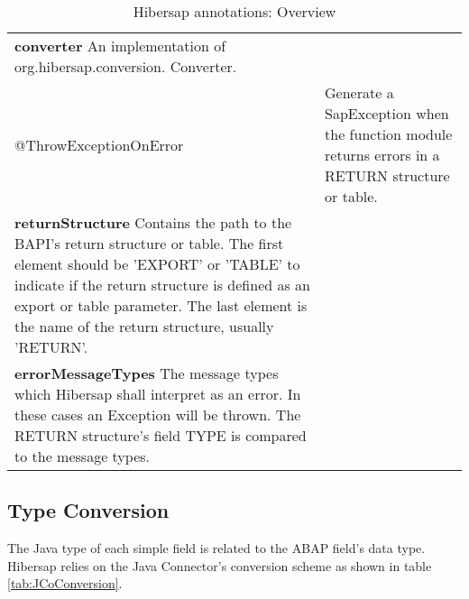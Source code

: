 \begin{table}[H]
\begin{tabularx}{\textwidth}{ l X }
                              \textbf{converter} An implementation of org.hibersap.conversion.
                              Converter. \\
    @ThrowExceptionOnError  & Generate a SapException when the function module returns
                              errors in a RETURN structure or table. \\
                              \textbf{returnStructure} Contains the path to the BAPI's return
                              structure or table. The first element should be 'EXPORT' or 
                              'TABLE' to indicate if the return structure is defined as an
                              export or table parameter. The last element is the name of the 
                              return structure, usually 'RETURN'. \\
                              \textbf{errorMessageTypes} The message types which Hibersap 
                              shall interpret as an error. In these cases an Exception
                              will be thrown. The RETURN structure's field TYPE is 
                              compared to the message types.\\
    \bottomrule
  \end{tabularx}
  \caption{Hibersap annotations: Overview}
  \label{tab:Annotations}
\end{table}

\subsection{Type Conversion}

The Java type of each simple field is related to the ABAP field's data type.
Hibersap relies on the Java Connector's conversion scheme as shown in table \ref{tab:JCoConversion}.

